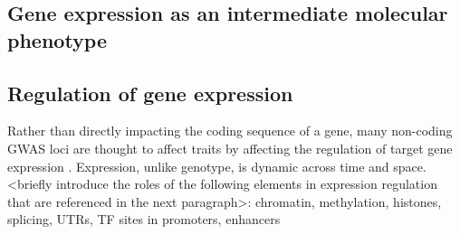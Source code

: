 \begin{outline}
%

\section{Gene expression as an intermediate molecular phenotype}

\subsection{Regulation of gene expression}


\1 Rather than directly impacting the coding sequence of a gene, 
many non-coding GWAS loci are thought to affect traits by affecting the regulation of target gene expression \autocite{gallagher2018PostGWASEraAssociation}.
    \2 Expression, unlike genotype, is dynamic across time and space.
    \2 <briefly introduce the roles of the following elements in expression regulation that are referenced in the next paragraph>: chromatin, methylation, histones, splicing, UTRs, TF sites in promoters, enhancers


\end{outline}
